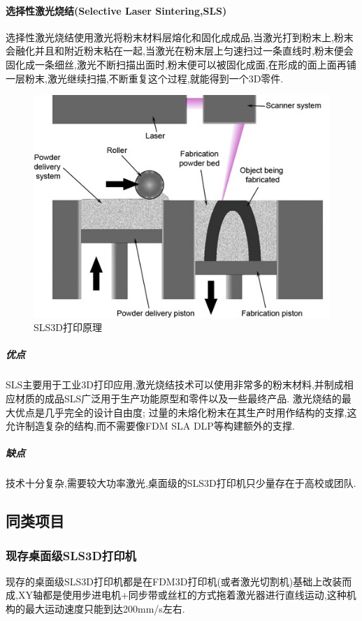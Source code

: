 \documentclass[a4paper,12pt,onecolumn,twoside]{article}
\begin{document}
\paragraph{选择性激光烧结(Selective Laser Sintering,SLS)}
选择性激光烧结使用激光将粉末材料层熔化和固化成成品,当激光打到粉末上,粉末会融化并且和附近粉末粘在一起,当激光在粉末层上匀速扫过一条直线时,粉末便会固化成一条细丝,激光不断扫描出面时,粉末便可以被固化成面,在形成的面上面再铺一层粉末,激光继续扫描,不断重复这个过程,就能得到一个3D零件.
\begin{figure}[ht]
\centering     
\includegraphics[width=0.9\linewidth]{SLS0.jpg}
\caption{SLS3D打印原理}
\end{figure}
\subparagraph{优点}
SLS主要用于工业3D打印应用,激光烧结技术可以使用非常多的粉末材料,并制成相应材质的成品SLS广泛用于生产功能原型和零件以及一些最终产品. 激光烧结的最大优点是几乎完全的设计自由度; 过量的未熔化粉末在其生产时用作结构的支撑,这允许制造复杂的结构,而不需要像FDM SLA DLP等构建额外的支撑.
\subparagraph{缺点}
技术十分复杂,需要较大功率激光,桌面级的SLS3D打印机只少量存在于高校或团队. 
\subsection{同类项目}
\subsubsection{现存桌面级SLS3D打印机}
现存的桌面级SLS3D打印机都是在FDM3D打印机(或者激光切割机)基础上改装而成,XY轴都是使用步进电机+同步带或丝杠的方式拖着激光器进行直线运动,这种机构的最大运动速度只能到达200mm/s左右.
\end{document}

